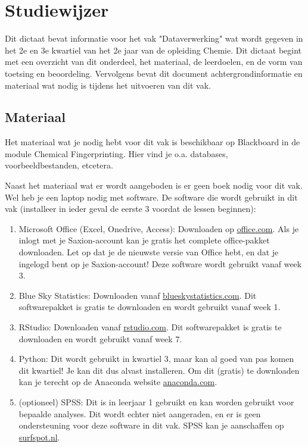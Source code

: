 \chapter{Studiewijzer}

Dit dictaat bevat informatie voor het vak "Dataverwerking" wat wordt gegeven in het 2e en 3e kwartiel van het 2e jaar van de opleiding Chemie. Dit dictaat begint met een overzicht van dit onderdeel, het materiaal, de leerdoelen, en de vorm van toetsing en beoordeling. Vervolgens bevat dit document achtergrondinformatie en materiaal wat nodig is tijdens het uitvoeren van dit vak.


\section{Materiaal}
Het materiaal wat je nodig hebt voor dit vak is beschikbaar op Blackboard in de module Chemical Fingerprinting. Hier vind je o.a. databases, voorbeeldbestanden, etcetera. 

Naast het materiaal wat er wordt aangeboden is er geen boek nodig voor dit vak. Wel heb je een laptop nodig met software. De software die wordt gebruikt in dit vak (installeer in ieder geval de eerste 3 voordat de lessen beginnen):
\begin{enumerate}
    \item Microsoft Office (Excel, Onedrive, Access): Downloaden op \href{https://office.com}{\textsf{office.com}}. Als je inlogt met je Saxion-account kan je gratis het complete office-pakket downloaden. Let op dat je de nieuwste versie van Office hebt, en dat je ingelogd bent op je Saxion-account! Deze software wordt gebruikt vanaf week 3. 
    \item Blue Sky Statistics: Downloaden vanaf \href{https://www.blueskystatistics.com/}{\textsf{blueskystatistics.com}}. Dit softwarepakket is gratis te downloaden en wordt gebruikt vanaf week 1. 
    \item RStudio: Downloaden vanaf \href{https://rstudio.com/}{\textsf{rstudio.com}}. Dit softwarepakket is gratis te downloaden en wordt gebruikt vanaf week 7.
    \item Python: Dit wordt gebruikt in kwartiel 3, maar kan al goed van pas komen dit kwartiel! Je kan dit dus alvast installeren. Om dit (gratis) te downloaden kan je terecht op de Anaconda website \href{https://www.anaconda.com/distribution/}{anaconda.com}.
    \item (optioneel) SPSS: Dit is in leerjaar 1 gebruikt en kan worden gebruikt voor bepaalde analyses. Dit wordt echter niet aangeraden, en er is geen ondersteuning voor deze software in dit vak. SPSS kan je aanschaffen op \href{https://www.surfspot.nl/}{surfspot.nl}.
\end{enumerate}

